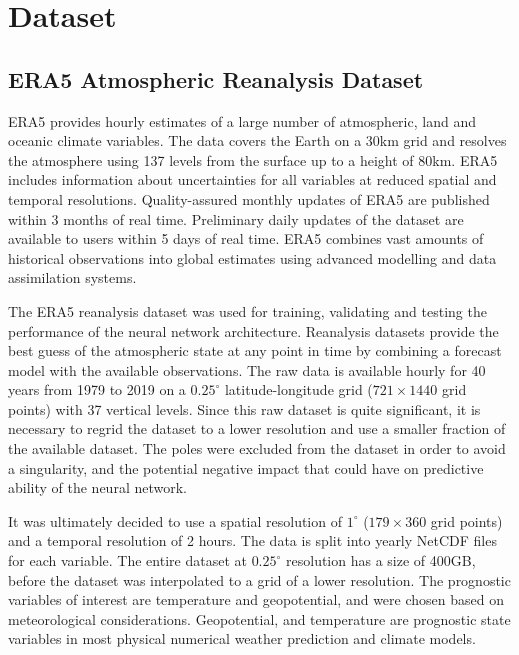 \section{Dataset}
\subsection{ERA5 Atmospheric Reanalysis Dataset}\label{era5_dataset}
ERA5 provides hourly estimates of a large number of atmospheric, land and oceanic climate variables. The data covers the Earth on a 30km grid and resolves the atmosphere using 137 levels from the surface up to a height of 80km. ERA5 includes information about uncertainties for all variables at reduced spatial and temporal resolutions. Quality-assured monthly updates of ERA5 are published within 3 months of real time. Preliminary daily updates of the dataset are available to users within 5 days of real time. ERA5 combines vast amounts of historical observations into global estimates using advanced modelling and data assimilation systems\cite{era5}.

The ERA5 reanalysis dataset was used for training, validating and testing the performance of the neural network architecture. Reanalysis datasets provide the best guess of the atmospheric state at any point in time by combining a forecast model with the available observations. The raw data is available hourly for 40 years from 1979 to 2019 on a $0.25^{\circ}$ latitude-longitude grid ($721 \times 1440$ grid points) with 37 vertical levels. Since this raw dataset is quite significant, it is necessary to regrid the dataset to a lower resolution and use a smaller fraction of the available dataset\cite{rasp2020weatherbench}.  The poles were excluded from the dataset in order to avoid a singularity, and the potential negative impact that could have on predictive ability of the neural network.

It was ultimately decided to use a spatial resolution of $1^{\circ}$ ($179 \times 360$ grid points) and a temporal resolution of 2 hours. The data is split into yearly NetCDF files for each variable. The entire dataset at $0.25^{\circ}$ resolution has a size of 400GB, before the dataset was interpolated to a grid of a lower resolution. The prognostic variables of interest are temperature and geopotential, and were chosen based on meteorological considerations. Geopotential, and temperature are prognostic state variables in most physical numerical weather prediction and climate models\cite{rasp2020weatherbench}. 

